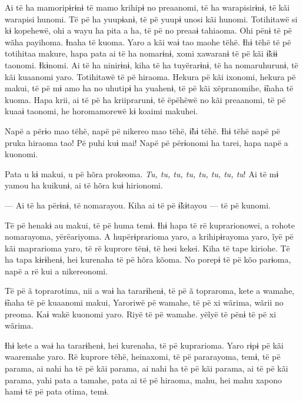 Ai të ha mamoripɨrɨnɨ të mamo krihipɨ no preaanomi, të ha warapisirɨnɨ,
të kãi warapisi hunomi. Të pë ha yuupɨanɨ, të pë yuupɨ unosi kãi hunomi.
Totihitawë si kɨ kopehewë, ohi a wayu ha pita a ha, të pë no preaaɨ
tahiaoma. Ohi pënɨ të pë wãha payihoma. Ɨnaha të kuoma. Yaro a kãi waɨ
tao maohe tëhë. Ɨhɨ tëhë të pë totihitaa makure, hapa pata ai të ha
nomarɨnɨ, xomi xawaranɨ të pë kãi ɨ̃kɨɨ taonomi. Ɨkɨnomi. Ai të ha
ninirɨnɨ, kiha të ha tuyërarɨnɨ, të ha nomaruhurunɨ, të kãi kuaanomi
yaro. Totihitawë të pë hiraoma. Hekura pë kãi ixonomi, hekura pë makui,
të pë mɨ amo ha no uhutipɨ ha yuahenɨ, të pë kãi xëpranomihe, ɨ̃naha të
kuoma. Hapa krii, ai të pë ha kriiprarunɨ, të ëpëhëwë no kãi preaanomi,
të pë kuaaɨ taonomi, he horomamorewë kɨ koaimi makuhei. 

Napë a përɨo mao tëhë, napë pë nikereo mao tëhë, ɨ̃hɨ tëhë. Ɨhɨ tëhë napë
pë pruka hiraoma tao! Pë puhi kuɨ mai! Napë pë përɨonomi ha tarei, hapa
napë a kuonomi. 

Pata u kɨ makui, u pë hõra prokeoma. \textit{Tu, tu, tu, tu, tu, tu, tu, tu}! Ai
të mɨ yamou ha kuikunɨ, ai të hõra kuɨ hirionomi. 


--- Ai të ha përɨnɨ, të nomarayou. Kiha ai të pë ɨ̃kɨtayou --- të pë
kunomi. 

Të pë henakɨ au makui, të pë huma temɨ. Ɨhɨ hapa të rë kuprarionowei, a
rohote nomarayoma, yërëariyoma. A hupërɨprarioma yaro, a krihipɨrayoma
yaro, ĩyë pë kãi maprarioma yaro, të rë kuprore tënɨ, të hesi kekei.
Kiha të tape kiriohe. Të ha tapa kɨrɨhenɨ, hei kurenaha të pë hõra
kõoma. No porepɨ të pë kõo parɨoma, napë a rë kui a nikereonomi. 

Të pë ã toprarotima, nii a waɨ ha tararɨhenɨ, të pë ã topraroma, kete a
wamahe, ɨ̃naha të pë kuaanomi makui, Yaroriwë pë wamahe, të pë xi wãrima,
wãrii no preoma. Kaɨ wakë kuonomi yaro. Riyë të pë wamahe. yëĩyë të pënɨ
të pë xi wãrima. 

Ɨhɨ kete a waɨ ha tararɨhenɨ, hei kurenaha, të pë kuprarioma. Yaro rɨpɨ
pë kãi waaremahe yaro. Rë kuprore tëhë, heinaxomi, të pë pararayoma,
temɨ, të pë parama, ai nahi ha të pë kãi parama, ai nahi ha të pë kãi
parama, ai të pë kãi parama, yahi pata a tamahe, pata ai të pë hiraoma,
mahu, hei mahu xapono hamɨ të pë pata otima, temɨ.

